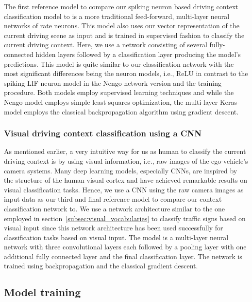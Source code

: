 The first reference model to compare our spiking neuron based driving context classification model to is a more traditional feed-forward, multi-layer neural networks of rate neurons.
This model also uses our vector representation of the current driving scene as input and is trained in supervised fashion to classify the current driving context.
Here, we use a network consisting of several fully-connected hidden layers followed by a classification layer producing the model's predictions.
This model is quite similar to our classification network with the most significant differences being the neuron models, i.e., \ac{ReLU} in contrast to the spiking \ac{LIF} neuron model in the \ac{Nengo} network version and the training procedure.
Both models employ supervised learning techniques and while the \ac{Nengo} model employs simple least squares optimization, the multi-layer Keras-model employs the classical backpropagation algorithm using gradient descent.

\subsubsection{Visual driving context classification using a \acs{CNN}}%
\label{ssubsec:visual_classification_using_cnn}

As mentioned earlier, a very intuitive way for us as human to classify the current driving context is by using visual information, i.e., raw images of the ego-vehicle's camera systems.
Many deep learning models, especially \acp{CNN}, are inspired by the structure of the human visual cortex and have achieved remarkable results on visual classification tasks.
Hence, we use a \ac{CNN} using the raw camera images as input data as our third and final reference model to compare our context classification network to.
We use a network architecture similar to the one employed in section~\ref{subsec:visual_vocabularies} to classify traffic signs based on visual input since this network architecture has been used successfully for classification tasks based on visual input.
The model is a multi-layer neural network with three convolutional layers each followed by a pooling layer with one additional fully connected layer and the final classification layer.
The network is trained using backpropagation and the classical gradient descent.

\subsection{Model training}%
\label{subsec:model_training}

